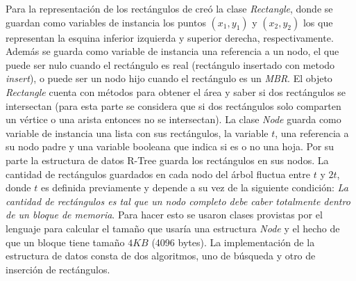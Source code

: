 \documentclass[letterpaper,12pt]{article}
\begin{document}
Para la representaci\'on de los rect\'angulos de cre\'o la clase \textit{Rectangle}, donde se guardan como variables de instancia los puntos $(x_1,y_1)$ y $(x_2,y_2)$ los que representan la esquina inferior izquierda y superior derecha, respectivamente. Adem\'as se guarda como variable de instancia una referencia a un nodo, el que puede ser nulo cuando el rect\'angulo es real (rect\'angulo insertado con metodo \textit{insert}), o puede ser un nodo hijo cuando el rect\'angulo es un \textit{MBR}. El objeto \textit{Rectangle} cuenta con m\'etodos para obtener el \'area y saber si dos rect\'angulos se intersectan (para esta parte se considera que si dos rect\'angulos solo comparten un v\'ertice o una arista entonces no se intersectan).
La clase \textit{Node} guarda como variable de instancia una lista con sus rect\'angulos, la variable $t$, una referencia a su nodo padre y una variable booleana que indica si es o no una hoja.
Por su parte la estructura de datos R-Tree guarda los rect\'angulos en sus nodos. La cantidad de rect\'angulos guardados en cada nodo del \'arbol fluctua entre $t$ y $2t$, donde $t$ es definida previamente y depende a su vez de la siguiente condici\'on: \textit{La cantidad de rect\'angulos es tal que un nodo completo debe caber totalmente dentro de un bloque de memoria}. Para hacer esto se usaron clases provistas por el lenguaje para calcular el tamaño que usar\'ia una estructura \textit{Node} y el hecho de que un bloque tiene tama\~no $4KB$ (4096 bytes).
La implementaci\'on de la estructura de datos consta de dos algoritmos, uno de b\'usqueda y otro de inserci\'on de rect\'angulos.
\end{document}
